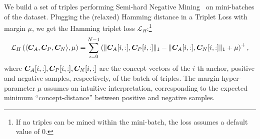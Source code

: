 %
We build a set of triples performing Semi-hard Negative Mining~\cite{schroff2015facenet} on mini-batches of the dataset. %
%
Plugging the (relaxed) Hamming distance in a Triplet Loss with margin $\mu$, we get the Hamming triplet loss $\mathcal{L}_H$:\footnote{If no triples can be mined within the mini-batch, the loss assumes a default value of 0.} 
\begin{equation*}
	\mathcal{L}_H\left(\langle{\bm{C}}_A, {\bm{C}}_P, {\bm{C}}_N\rangle, \mu\right) = \sum_{i = 0}^{N-1} \left(\|{\bm{C}}_A[i,:], {\bm{C}}_P[i,:]\|_1 - \|{\bm{C}}_A[i,:], {\bm{C}}_N[i,:]\|_1 + \mu\right)^+,
\end{equation*}
where ${\bm{C}}_A[i,:], {\bm{C}}_P[i,:], {\bm{C}}_N[i,:]$ are the concept vectors of the $i$-th anchor, positive and negative samples, respectively, of the batch of triples.
The margin hyper-parameter $\mu$ assumes an intuitive interpretation, corresponding to the expected minimum ``concept-distance'' between positive and negative samples.

